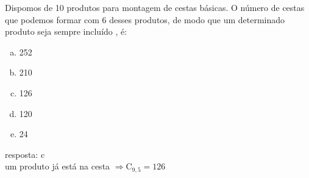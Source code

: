 \begin{ex}
 Dispomos de 10 produtos para montagem de cestas básicas. O número de cestas que podemos formar com 6 desses produtos, de modo que um determinado produto seja sempre incluído , é:
    \begin{enumerate}[(a)]
    \item 252
    \item 210
    \item 126
    \item 120
    \item 24
    \end{enumerate}
     \begin{sol}
       resposta: c \\
       um produto já está na cesta  $\Longrightarrow \mathrm{C}_{9,5}=126$
     \end{sol}
    
\end{ex}